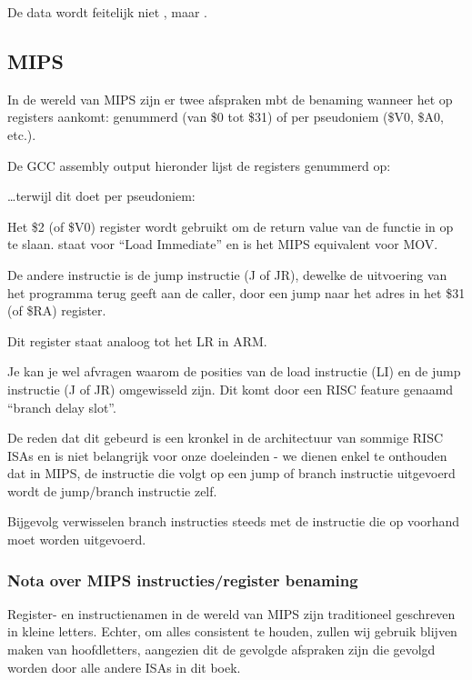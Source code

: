 De data wordt feitelijk niet , maar .

\subsection{MIPS}

\label{MIPS_leaf_function_ex1}
In de wereld van MIPS zijn er twee afspraken mbt de benaming wanneer het op registers aankomt:
genummerd (van \$0 tot \$31) of per pseudoniem (\$V0, \$A0, etc.).

De GCC assembly output hieronder lijst de registers genummerd op:



\dots terwijl \IDA dit doet per pseudoniem:



Het \$2 (of \$V0) register wordt gebruikt om de return value van de functie in op te slaan.
 staat voor ``Load Immediate'' en is het MIPS equivalent voor MOV.

De andere instructie is de jump instructie (J of JR), dewelke de uitvoering van het programma terug geeft aan de \gls{caller}, door een jump naar het adres in het \$31 (of \$RA) register.

Dit register staat analoog tot het \ac{LR} in ARM.

Je kan je wel afvragen waarom de posities van de load instructie (LI) en de jump instructie (J of JR) omgewisseld zijn. Dit komt door een \ac{RISC} feature genaamd ``branch delay slot''.

De reden dat dit gebeurd is een kronkel in de architectuur van sommige RISC \ac{ISA}s en is niet belangrijk voor onze doeleinden - we dienen enkel te onthouden dat in MIPS, de instructie die volgt op een jump of branch instructie uitgevoerd wordt  de jump/branch instructie zelf.

Bijgevolg verwisselen branch instructies steeds met de instructie die op voorhand moet worden uitgevoerd.

\subsubsection{Nota over MIPS instructies/register benaming}

Register- en instructienamen in de wereld van MIPS zijn traditioneel geschreven in kleine letters.
Echter, om alles consistent te houden, zullen wij gebruik blijven maken van hoofdletters, aangezien dit de gevolgde afspraken zijn die gevolgd worden door alle andere \ac{ISA}s in dit boek.

